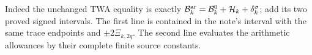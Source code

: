 Indeed the unchanged TWA equality is exactly
$\mathcal B_k^{\rm ar}=\mathcal B_k^0+
\mathcal H_k+\delta_k^\sigma$; add its two proved
signed intervals. The first line is contained in the
note's interval with the same trace endpoints and
$\pm2\Xi_{k,2q}$. The second line evaluates the arithmetic
allowances by their complete finite source constants.